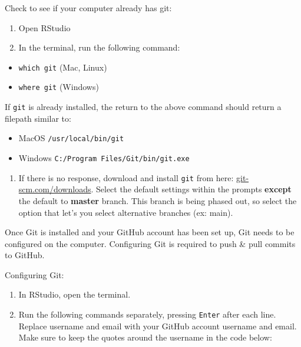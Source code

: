 \documentclass[
]{book}
\providecommand{\tightlist}{%
  \setlength{\itemsep}{0pt}\setlength{\parskip}{0pt}}
\begin{document}
Check to see if your computer already has git:

\begin{enumerate}
\def\labelenumi{\arabic{enumi}.}
\tightlist
\item
  Open RStudio
\item
  In the terminal, run the following command:
\end{enumerate}

\begin{itemize}
\tightlist
\item
  \texttt{which\ git} (Mac, Linux)
\item
  \texttt{where\ git} (Windows)
\end{itemize}

If \texttt{git} is already installed, the return to the above command should return a filepath similar to:

\begin{itemize}
\tightlist
\item
  MacOS \texttt{/usr/local/bin/git}
\item
  Windows \texttt{C:/Program\ Files/Git/bin/git.exe}
\end{itemize}

\begin{enumerate}
\def\labelenumi{\arabic{enumi}.}
\setcounter{enumi}{2}
\tightlist
\item
  If there is no response, download and install \texttt{git} from here: \href{https://git-scm.com/downloads}{git-scm.com/downloads}. Select the default settings within the prompts \textbf{except} the default to \textbf{master} branch. This branch is being phased out, so select the option that let's you select alternative branches (ex: main).
\end{enumerate}

Once Git is installed and your GitHub account has been set up, Git needs to be configured on the computer. Configuring Git is required to push \& pull commits to GitHub.

Configuring Git:

\begin{enumerate}
\def\labelenumi{\arabic{enumi}.}
\tightlist
\item
  In RStudio, open the terminal.
\item
  Run the following commands separately, pressing \texttt{Enter} after each line. Replace username and email with your GitHub account username and email. Make sure to keep the quotes around the username in the code below:
\end{enumerate}
\end{document}
